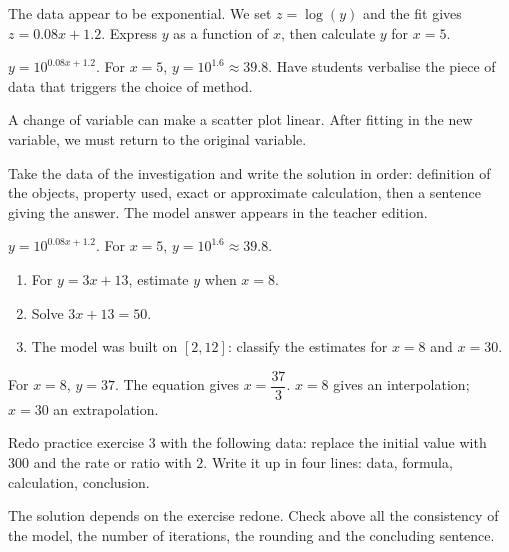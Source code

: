 \begin{activity}
The data appear to be exponential. We set $z=\log(y)$ and the fit gives $z=\num{0,08}x+\num{1,2}$. Express $y$ as a function of $x$, then calculate $y$ for $x=5$.

\end{activity}
\begin{solution}$y=10^{\num{0,08}x+\num{1,2}}$. For $x=5$, $y=10^{\num{1,6}}\approx\num{39,8}$. Have students verbalise the piece of data that triggers the choice of method.\end{solution}

\begin{summary}A change of variable can make a scatter plot linear. After fitting in the new variable, we must return to the original variable.\end{summary}

\begin{example}
Take the data of the investigation and write the solution in order: definition of the objects, property used, exact or approximate calculation, then a sentence giving the answer. The model answer appears in the teacher edition.
\end{example}
\begin{solution}$y=10^{\num{0,08}x+\num{1,2}}$. For $x=5$, $y=10^{\num{1,6}}\approx\num{39,8}$.\end{solution}

\begin{exercise}[essential]
\begin{enumerate}\item For $y=3x+13$, estimate $y$ when $x=8$.\item Solve $3x+13=50$.\item The model was built on $[2,12]$: classify the estimates for $x=8$ and $x=30$.\end{enumerate}
\end{exercise}
\begin{solution}For $x=8$, $y=37$. The equation gives $x=\dfrac{37}{3}$. $x=8$ gives an interpolation; $x=30$ an extrapolation.\end{solution}


\begin{homework}Redo practice exercise 3 with the following data: replace the initial value with $300$ and the rate or ratio with $2$. Write it up in four lines: data, formula, calculation, conclusion.\end{homework}
\begin{solution}The solution depends on the exercise redone. Check above all the consistency of the model, the number of iterations, the rounding and the concluding sentence.\end{solution}

